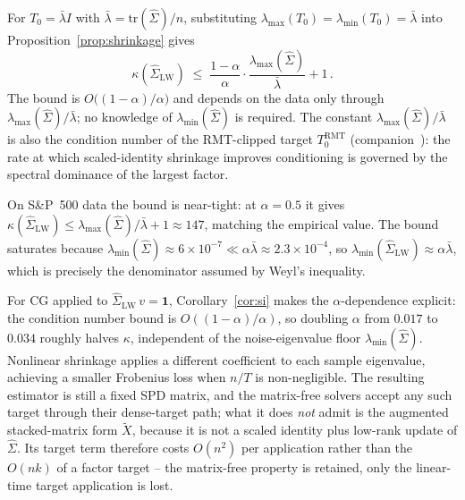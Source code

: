 \begin{corollary}\label{cor:si}
  For $T_0 = \bar\lambda I$ with $\bar\lambda = \mathrm{tr}(\hat\Sigma)/n$,
  substituting $\lambda_{\max}(T_0) = \lambda_{\min}(T_0) = \bar\lambda$ into
  Proposition~\ref{prop:shrinkage} gives
  \[
    \kappa(\hat\Sigma_{\mathrm{LW}}) \;\leq\;
    \frac{1-\alpha}{\alpha}\cdot\frac{\lambda_{\max}(\hat\Sigma)}{\bar\lambda} + 1\,.
  \]
  The bound is $O\!\bigl((1-\alpha)/\alpha\bigr)$ and depends on the data only through
  $\lambda_{\max}(\hat\Sigma)/\bar\lambda$; no knowledge of $\lambda_{\min}(\hat\Sigma)$
  is required. The constant $\lambda_{\max}(\hat\Sigma)/\bar\lambda$ is also the
  condition number of the RMT-clipped target $T_0^{\mathrm{RMT}}$ (companion~\cite{schmelzer2026rmt}):
  the rate at which scaled-identity shrinkage improves conditioning is governed by
  the spectral dominance of the largest factor.
\end{corollary}
On S\&P~500 data the bound is near-tight: at $\alpha=0.5$ it gives
$\kappa(\hat\Sigma_{\mathrm{LW}}) \leq \lambda_{\max}(\hat\Sigma)/\bar\lambda + 1 \approx 147$,
matching the empirical value.
The bound saturates because $\lambda_{\min}(\hat\Sigma) \approx 6\times10^{-7} \ll \alpha\bar\lambda \approx 2.3\times10^{-4}$,
so $\lambda_{\min}(\hat\Sigma_{\mathrm{LW}}) \approx \alpha\bar\lambda$, which is precisely
the denominator assumed by Weyl's inequality.


For CG applied to $\hat\Sigma_{\mathrm{LW}}\,v = \mathbf{1}$,
Corollary~\ref{cor:si} makes the $\alpha$-dependence explicit: the condition number
bound is $O((1-\alpha)/\alpha)$, so doubling $\alpha$ from $0.017$ to $0.034$ roughly
halves $\kappa$, independent of the noise-eigenvalue floor $\lambda_{\min}(\hat\Sigma)$.
Nonlinear shrinkage \cite{ledoit2020} applies a
different coefficient to each sample eigenvalue, achieving a smaller Frobenius loss
when $n/T$ is non-negligible. The resulting estimator is still a fixed SPD matrix, and
the matrix-free solvers accept any such target through their dense-target path; what it
does \emph{not} admit is the augmented stacked-matrix form $\tilde{X}$, because it is not
a scaled identity plus low-rank update of $\hat\Sigma$. Its target term therefore costs
$O(n^2)$ per application rather than the $O(nk)$ of a factor target -- the matrix-free
property is retained, only the linear-time target application is lost.

